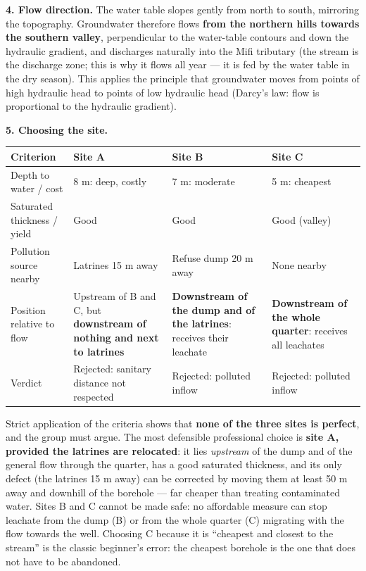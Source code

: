 \documentclass[11pt]{article}
\newcommand{\cle}[1]{{\popxbold\color{popdark}#1}}
\begin{document}
\textbf{4. Flow direction.} The water table slopes gently from north to south, mirroring the topography. Groundwater therefore flows \textbf{from the northern hills towards the southern valley}, perpendicular to the water-table contours and down the hydraulic gradient, and discharges naturally into the Mifi tributary (the stream is the \cle{discharge zone}; this is why it flows all year --- it is fed by the water table in the dry season). This applies the principle that groundwater moves from points of high hydraulic head to points of low hydraulic head (Darcy's law: flow is proportional to the hydraulic gradient).

\textbf{5. Choosing the site.}

\begin{center}
\begin{tabularx}{\linewidth}{|l|X|X|X|}
\hline
\rowcolor{popblueL} \textbf{Criterion} & \textbf{Site A} & \textbf{Site B} & \textbf{Site C} \\
\hline
Depth to water / cost & 8 m: deep, costly & 7 m: moderate & 5 m: cheapest \\
\hline
Saturated thickness / yield & Good & Good & Good (valley) \\
\hline
Pollution source nearby & Latrines 15 m away & Refuse dump 20 m away & None nearby \\
\hline
Position relative to flow & Upstream of B and C, but \textbf{downstream of nothing and next to latrines} & \textbf{Downstream of the dump and of the latrines}: receives their leachate & \textbf{Downstream of the whole quarter}: receives all leachates \\
\hline
Verdict & Rejected: sanitary distance not respected & Rejected: polluted inflow & Rejected: polluted inflow \\
\hline
\end{tabularx}
\end{center}

Strict application of the criteria shows that \textbf{none of the three sites is perfect}, and the group must argue. The most defensible professional choice is \textbf{site A, provided the latrines are relocated}: it lies \emph{upstream} of the dump and of the general flow through the quarter, has a good saturated thickness, and its only defect (the latrines 15 m away) can be corrected by moving them at least 50 m away and downhill of the borehole --- far cheaper than treating contaminated water. Sites B and C cannot be made safe: no affordable measure can stop leachate from the dump (B) or from the whole quarter (C) migrating with the flow towards the well. Choosing C because it is ``cheapest and closest to the stream'' is the classic beginner's error: the cheapest borehole is the one that does not have to be abandoned.
\end{document}
